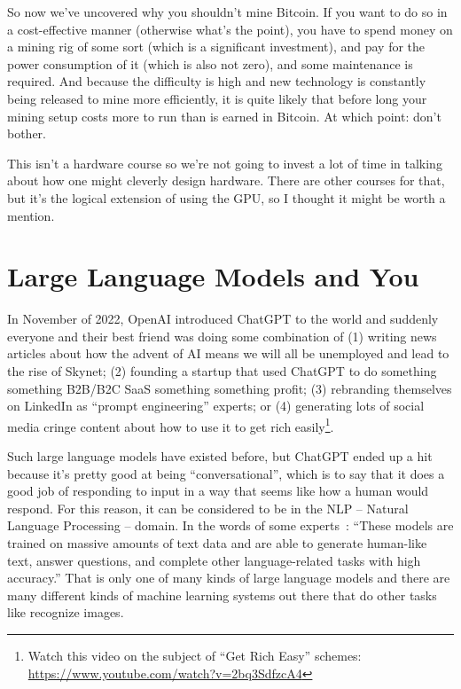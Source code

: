 So now we've uncovered why you shouldn't mine Bitcoin. If you want to do so in a cost-effective manner (otherwise what's the point), you have to spend money on a mining rig of some sort (which is a significant investment), and pay for the power consumption of it (which is also not zero), and some maintenance is required. And because the difficulty is high and new technology is constantly being released to mine more efficiently, it is quite likely that before long your mining setup costs more to run than is earned in Bitcoin. At which point: don't bother.

This isn't a hardware course so we're not going to invest a lot of time in talking about how one might cleverly design hardware. There are other courses for that, but it's the logical extension of using the GPU, so I thought it might be worth a mention.

\section*{Large Language Models and You}

In November of 2022, OpenAI introduced ChatGPT to the world and suddenly everyone and their best friend was doing some combination of (1) writing news articles about how the advent of AI means we will all be unemployed and lead to the rise of Skynet; (2) founding a startup that used ChatGPT to do something something B2B/B2C SaaS something something profit; (3) rebranding themselves on LinkedIn as ``prompt engineering'' experts; or (4) generating lots of social media cringe content about how to use it to get rich easily\footnote{Watch this video on the subject of ``Get Rich Easy'' schemes: \url{https://www.youtube.com/watch?v=2bq3SdfzcA4}}.

Such large language models have existed before, but ChatGPT ended up a hit because it's pretty good at being ``conversational'', which is to say that it does a good job of responding to input in a way that seems like how a human would respond. For this reason, it can be considered to be in the NLP -- Natural Language Processing -- domain. In the words of some experts~\cite{gptforgood}: ``These models are trained on massive amounts of text data and are able to generate human-like text, answer questions, and complete other language-related tasks with high accuracy.'' That is only one of many kinds of large language models and there are many different kinds of machine learning systems out there that do other tasks like recognize images.

